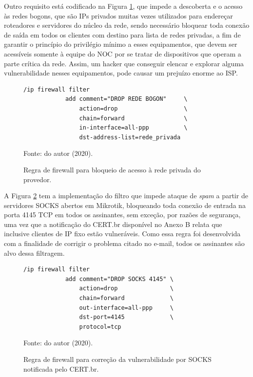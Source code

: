     Outro requisito está codificado na Figura \ref{fig:drop_bogon}, que impede a descoberta e o acesso às redes bogons, que são IPs privados muitas vezes utilizados para endereçar roteadores e servidores do núcleo da rede, sendo necessário bloquear toda conexão de saída em todos os clientes com destino para lista de redes privadas, a fim de garantir o princípio do privilégio mínimo a esses equipamentos, que devem ser acessíveis somente à equipe do NOC por se tratar de dispositivos que operam a parte crítica da rede. Assim, um hacker que conseguir elencar e explorar alguma vulnerabilidade nesses equipamentos, pode causar um prejuízo enorme ao ISP.
    
    \begin{figure}[!htb]
        \centering
        \caption{Regra de firewall para bloqueio de acesso à rede privada do provedor.} 
        \label{fig:drop_bogon}
        
        \begin{Verbatim}[fontsize=\normalsize]
            /ip firewall filter
            add comment="DROP REDE BOGON"     \
                action=drop                   \
                chain=forward                 \
                in-interface=all-ppp          \
                dst-address-list=rede_privada
        \end{Verbatim} 

        {\small Fonte: do autor (2020).} 
    \end{figure}
    
    A Figura \ref{fig:drop_socks} tem a implementação do filtro que impede ataque de \textit{spam} a partir de servidores SOCKS abertos em Mikrotik, bloqueando toda conexão de entrada na porta 4145 TCP em todos os assinantes, sem exceção, por razões de segurança, uma vez que a notificação do CERT.br disponível no Anexo B relata que inclusive clientes de IP fixo estão vulneráveis. Como essa regra foi desenvolvida com a finalidade de corrigir o problema citado no e-mail, todos os assinantes são alvo dessa filtragem.
    
    \begin{figure}[!htb]
        \centering
        \caption{Regra de firewall para correção da vulnerabilidade por SOCKS notificada pelo CERT.br.} 
        \label{fig:drop_socks}
        
        \begin{Verbatim}[fontsize=\normalsize]
            /ip firewall filter
            add comment="DROP SOCKS 4145" \
                action=drop               \
                chain=forward             \
                out-interface=all-ppp     \
                dst-port=4145             \
                protocol=tcp
        \end{Verbatim} 

        {\small Fonte: do autor (2020).} 
    \end{figure}
    
